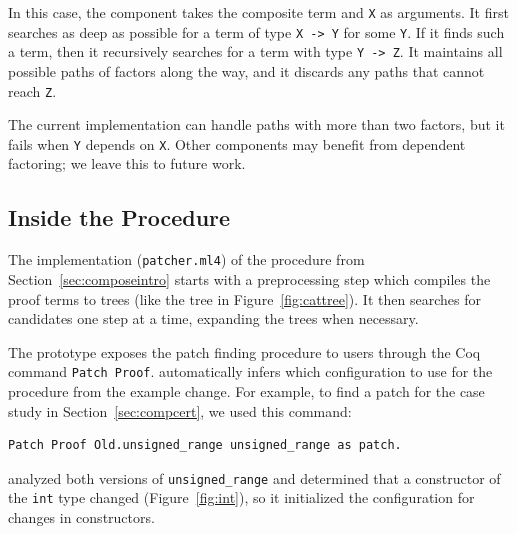 In this case, the component takes the composite term and \lstinline{X} as arguments.
It first searches as deep as possible for a term of type \lstinline{X -> Y} for some \lstinline{Y}.
If it finds such a term, then it recursively searches for a term with type \lstinline{Y -> Z}. 
It maintains all possible 
paths of factors along the way, and it discards any paths that cannot reach \lstinline{Z}.

The current implementation can handle paths
with more than two factors, but it fails when \lstinline{Y} depends on \lstinline{X}.
Other components may benefit from dependent factoring; we leave this to future work.

\subsection{Inside the Procedure}
\label{sec:algimpl}

The implementation (\lstinline{patcher.ml4}) of the procedure from Section~\ref{sec:composeintro} starts with a
preprocessing step which compiles the proof terms to trees (like the tree in Figure~\ref{fig:cattree}).
It then searches for candidates one step at a time, expanding the trees when necessary.

\lstset{language=ml4}
The \sysname prototype exposes the patch finding procedure to users through the Coq 
command \lstinline{Patch Proof}. \sysname automatically
infers which configuration to use for the procedure from the example change. For example, to
find a patch for the case study in Section~\ref{sec:compcert}, we
used this command:

\begin{lstlisting}[language=ml4]
 Patch Proof Old.unsigned_range unsigned_range as patch.
\end{lstlisting}

\sysname analyzed both versions of \lstinline{unsigned_range} and determined 
that a constructor of the \lstinline{int} type changed (Figure~\ref{fig:int}),
so it initialized the configuration for changes in constructors.



